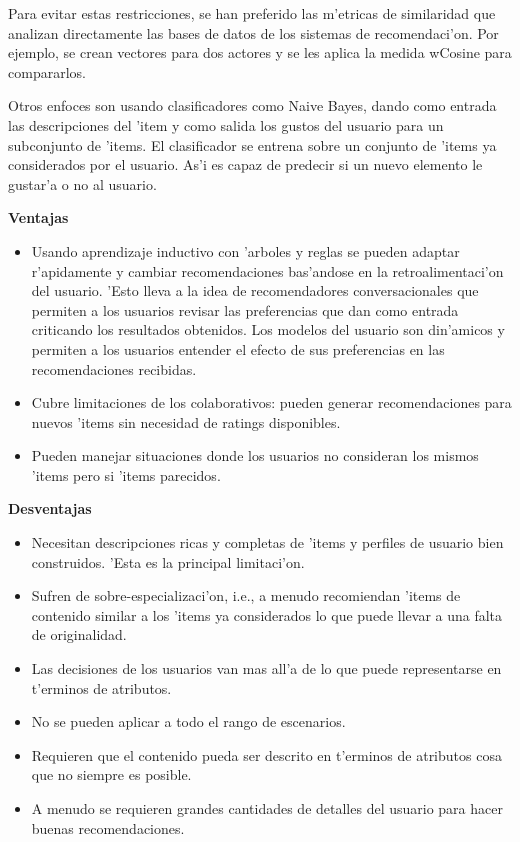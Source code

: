 \documentclass[11pt]{article}
\begin{document}
Para evitar estas restricciones, se han preferido las m'etricas de similaridad que analizan directamente las bases de datos de los sistemas de recomendaci'on. Por ejemplo, se crean vectores para dos actores y se les aplica la medida wCosine para compararlos.

Otros enfoces son usando clasificadores como Naive Bayes, dando como entrada las descripciones del 'item y como salida los gustos del usuario para un subconjunto de 'items. El clasificador se entrena sobre un conjunto de 'items ya considerados por el usuario. As'i es capaz de predecir si un nuevo elemento le gustar'a o no al usuario.

\medskip
\noindent
\textbf{Ventajas}

\begin{itemize}
\item  Usando aprendizaje inductivo con 'arboles y reglas se pueden adaptar r'apidamente y cambiar recomendaciones bas'andose en la retroalimentaci'on del usuario. 'Esto lleva a la idea de recomendadores conversacionales que permiten a los usuarios revisar las preferencias que dan como entrada criticando los resultados obtenidos. Los modelos del usuario son din'amicos y permiten a los usuarios entender el efecto de sus preferencias en las recomendaciones recibidas.
\item Cubre limitaciones de los colaborativos: pueden generar recomendaciones para nuevos 'items sin necesidad de ratings disponibles.
\item Pueden manejar situaciones donde los usuarios no consideran los mismos 'items pero si 'items parecidos.
\end{itemize}

\medskip
\noindent
\textbf{Desventajas}

\begin{itemize}
\item Necesitan descripciones ricas y completas de 'items y perfiles de usuario bien construidos. 'Esta es la principal limitaci'on.
\item Sufren de sobre-especializaci'on, i.e., a menudo recomiendan 'items de contenido similar a los 'items ya considerados lo que puede llevar a una falta de originalidad.
\item Las decisiones de los usuarios van mas all'a de lo que puede representarse en t'erminos de atributos.
\item No se pueden aplicar a todo el rango de escenarios.
\item Requieren que el contenido pueda ser descrito en t'erminos de atributos cosa que no siempre es posible.
\item A menudo se requieren grandes cantidades de detalles del usuario para hacer buenas recomendaciones.
\end{itemize}
\end{document}
